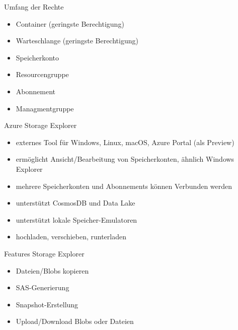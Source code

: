 \begin{flashcard}[Definition]{Umfang der Rechte}
    \begin{itemize}
        \item Container (geringste Berechtigung)
        \item Warteschlange (geringste Berechtigung)
        \item Speicherkonto
        \item Resourcengruppe
        \item Abonnement
        \item Managmentgruppe
    \end{itemize}
\end{flashcard}


\begin{flashcard}[Definition]{Azure Storage Explorer}
    \begin{itemize}
        \item externes Tool für Windows, Linux, macOS, Azure Portal (als Preview)
        \item ermöglicht Ansicht/Bearbeitung von Speicherkonten, ähnlich Windows Explorer
        \item mehrere Speicherkonten und Abonnements können Verbunden werden
        \item unterstützt CosmosDB und Data Lake
        \item unterstützt lokale Speicher-Emulatoren
        \item hochladen, verschieben, runterladen
    \end{itemize}
\end{flashcard}

\begin{flashcard}[Definition]{Features Storage Explorer}
    \begin{itemize}
        \item Dateien/Blobs kopieren
        \item SAS-Generierung
        \item Snapshot-Erstellung
        \item Upload/Download Blobs oder Dateien
    \end{itemize}
\end{flashcard}


